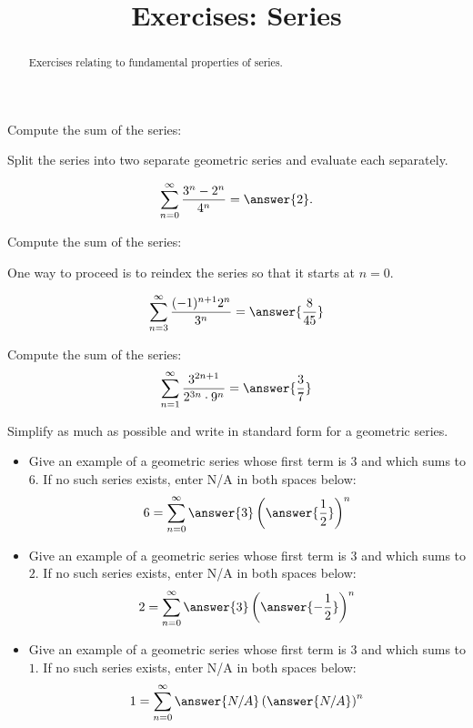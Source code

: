 \documentclass{ximera}
\title{Exercises: Series}
\begin{document}
\begin{abstract}
Exercises relating to fundamental properties of series.
\end{abstract}
\maketitle


\begin{exercise}
Compute the sum of the series:
\begin{hint} Split the series into two separate geometric series and evaluate each separately. \end{hint}
\[ \sum_{n=0}^\infty \frac{3^n - 2^n}{4^n}  = \answer{2}. \]
\end{exercise}


\begin{exercise}
Compute the sum of the series:
\begin{hint} One way to proceed is to reindex the series so that it starts at $n = 0$. \end{hint}
\[ \sum_{n=3}^\infty \frac{(-1)^{n+1} 2^n}{3^n} = \answer{ \frac{8}{45} } \]
\end{exercise}

\begin{exercise}
Compute the sum of the series:
\[ \sum_{n=1}^\infty \frac{3^{2n+1}}{2^{3n} \cdot 9^n} = \answer{\frac{3}{7}} \]
\begin{hint} Simplify as much as possible and write in standard form for a geometric series.\end{hint}
\end{exercise}

\begin{exercise}
\begin{itemize}
\item Give an example of a geometric series whose first term is $3$ and which sums to $6$. If no such series exists, enter N/A in both spaces below:
\[ 6 = \sum_{n=0}^\infty \answer{3} \left( \answer{\frac{1}{2}} \right)^n \]
\item Give an example of a geometric series whose first term is $3$ and which sums to $2$. If no such series exists, enter N/A in both spaces below:
\[ 2 = \sum_{n=0}^\infty \answer{3} \left( \answer{- \frac{1}{2}} \right)^n \]
\item Give an example of a geometric series whose first term is $3$ and which sums to $1$. If no such series exists, enter N/A in both spaces below:
\[ 1 = \sum_{n=0}^\infty \answer{N/A} \left( \answer{N/A} \right)^n \]
\end{itemize}
\end{exercise}
\end{document}
